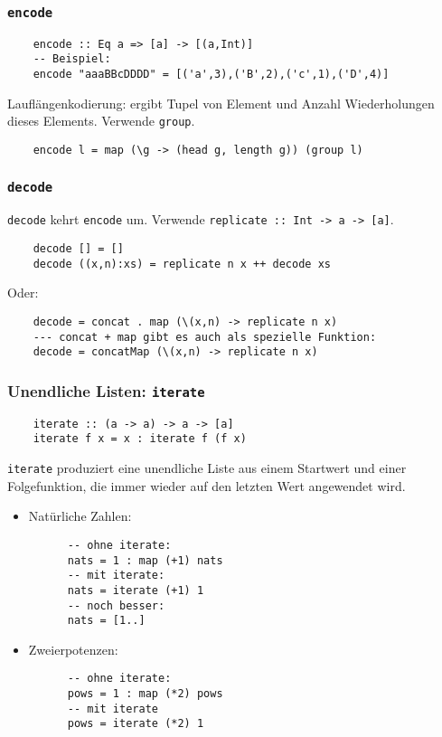 \documentclass{beamer}
\begin{document}
\begin{frame}[fragile]
  \frametitle{\lstinline{encode}}
  \begin{lstlisting}
    encode :: Eq a => [a] -> [(a,Int)]
    -- Beispiel:
    encode "aaaBBcDDDD" = [('a',3),('B',2),('c',1),('D',4)]
  \end{lstlisting}
  Lauflängenkodierung: ergibt Tupel von Element und Anzahl Wiederholungen dieses Elements.
  Verwende \lstinline{group}.
  \pause
  \begin{lstlisting}
    encode l = map (\g -> (head g, length g)) (group l)
  \end{lstlisting}
\end{frame}

\begin{frame}[fragile]
  \frametitle{\lstinline{decode}}
  \lstinline{decode} kehrt \lstinline{encode} um.
  Verwende \lstinline{replicate :: Int -> a -> [a]}.
  \pause
  \begin{lstlisting}
    decode [] = []
    decode ((x,n):xs) = replicate n x ++ decode xs
  \end{lstlisting}
  Oder:
  \begin{lstlisting}
    decode = concat . map (\(x,n) -> replicate n x)
    --- concat + map gibt es auch als spezielle Funktion:
    decode = concatMap (\(x,n) -> replicate n x)
  \end{lstlisting}
\end{frame}

\begin{frame}[fragile]
  \frametitle{Unendliche Listen: \lstinline{iterate}}
  \begin{lstlisting}
    iterate :: (a -> a) -> a -> [a]
    iterate f x = x : iterate f (f x)
  \end{lstlisting}
  \lstinline{iterate} produziert eine unendliche Liste aus einem Startwert und einer Folgefunktion,
  die immer wieder auf den letzten Wert angewendet wird.

  \begin{itemize}
  \item Natürliche Zahlen:
    \pause
    \begin{lstlisting}
      -- ohne iterate:
      nats = 1 : map (+1) nats
      -- mit iterate:
      nats = iterate (+1) 1
      -- noch besser:
      nats = [1..]
    \end{lstlisting}
    \pause
  \item Zweierpotenzen:
    \pause
    \begin{lstlisting}
      -- ohne iterate:
      pows = 1 : map (*2) pows
      -- mit iterate
      pows = iterate (*2) 1
    \end{lstlisting}
  \end{itemize}
\end{frame}
\end{document}

